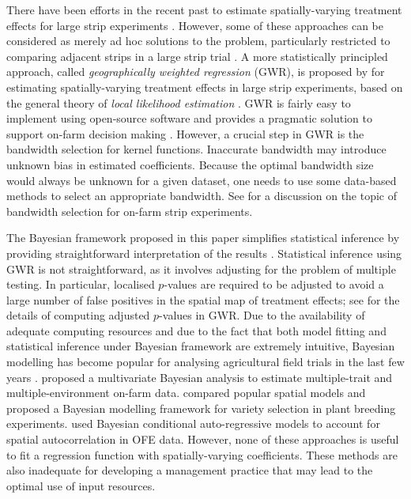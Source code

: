 \documentclass[a4paper]{article}   	%
\begin{document}
	
	There have been efforts in the recent past to estimate spatially-varying treatment effects for large strip experiments \parencite{Lawes2012Simple, Marchant2019Establishinga, Rakshit2020Novel, Evans2020Assessment}. However, some of these approaches can be considered as merely ad hoc solutions to the problem, particularly restricted to comparing adjacent strips in a large strip trial \parencite{Lawes2012Simple}. A more statistically principled approach, called \emph{geographically weighted regression} (GWR), is proposed by \textcite{Rakshit2020Novel} for estimating spatially-varying treatment effects in large strip experiments, based on the general theory of \emph{local likelihood estimation} \parencite{Hastie1993Local}. GWR is fairly easy to implement using open-source software and provides a pragmatic solution to support on-farm decision making \parencite{Evans2020Assessment}. However, a crucial step in GWR is the bandwidth selection for kernel functions. Inaccurate bandwidth may introduce unknown bias in estimated coefficients. Because the optimal bandwidth size would always be unknown for a given dataset, one needs to use some data-based methods to select an appropriate bandwidth. See \textcite{Rakshit2020Novel} for a discussion on the topic of bandwidth selection for on-farm strip experiments. %
	
	
	The Bayesian framework proposed in this paper simplifies statistical inference by providing straightforward interpretation of the results \parencite{Che2010Bayesian}. Statistical inference using GWR is not straightforward, as it involves adjusting for the problem of multiple testing. In particular, localised $p$-values are required to be adjusted to avoid a large number of false positives in the spatial map of treatment effects; see \textcite{Rakshit2020Novel} for the details of computing adjusted $p$-values in GWR. Due to the availability of adequate computing resources and due to the fact that both model fitting and statistical inference under Bayesian framework are extremely intuitive, Bayesian modelling has become popular for analysing agricultural field trials in the last few years \parencite{Besag1999Bayesian, Theobald2002Bayesian, Che2010Bayesian, Donald2011Bayesian,  Montesinos-Lopez2018Multivariate, Selle2019Flexible, Shirley2020Empirical}. \textcite{Montesinos-Lopez2018Multivariate} proposed a multivariate Bayesian analysis to estimate multiple-trait and multiple-environment on-farm data. \textcite{Selle2019Flexible} compared popular spatial models and proposed a Bayesian modelling framework for variety selection in plant breeding experiments. \textcite{Jiang2009Bayesian} used Bayesian conditional auto-regressive models to account for spatial autocorrelation in OFE data. However, none of these approaches is useful to fit a regression function with spatially-varying coefficients. These methods are also inadequate for developing a management practice that may lead to the optimal use of input resources. 
	
\end{document}

